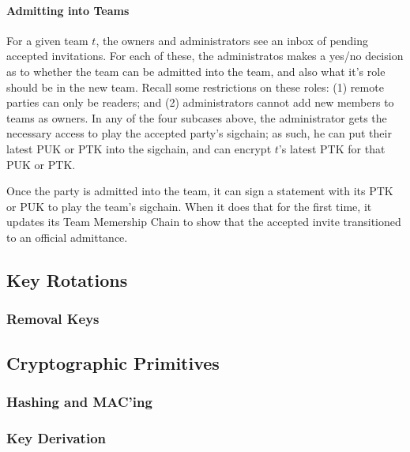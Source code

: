 \paragraph{Admitting into Teams}

For a given team $t$, the owners and administrators see an inbox of pending
accepted invitations. For each of these, the administratos makes a yes/no
decision as to whether the team can be admitted into the team, and also what
it's role should be in the new team. Recall some restrictions on these roles: 
(1) remote parties can only be readers; and (2) administrators cannot add new
members to teams as owners. In any of the four subcases above, the administrator
gets the necessary access to play the accepted party's sigchain; as such,
he can put their latest PUK or PTK into the sigchain, and can encrypt
$t$'s latest PTK for that PUK or PTK.

Once the party is admitted into the team, it can sign a statement with its PTK
or PUK to play the team's sigchain. When it does that for the first time, it
updates its Team Memership Chain to show that the accepted invite transitioned
to an official admittance. 


\subsection{Key Rotations}
\label{sec:clkr}

\subsubsection{Removal Keys}
\label{sec:removal-keys}

\subsection{Cryptographic Primitives}
\label{sec:cryptography}

\subsubsection{Hashing and MAC'ing}

\subsubsection{Key Derivation}

\subsubsection{\Yubis}

